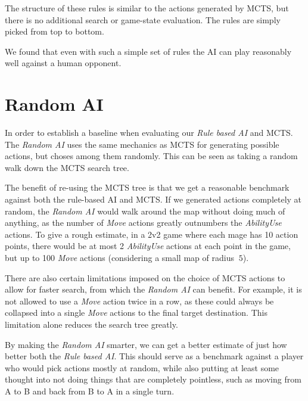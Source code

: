 The structure of these rules is similar to the actions generated by MCTS,
but there is no additional search or game-state evaluation. The rules are
simply picked from top to bottom.

We found that even with such a simple set of rules the AI can play reasonably
well against a human opponent.


\section{Random AI}

In order to establish a baseline when evaluating our \emph{Rule based AI} and MCTS.
The \emph{Random AI} uses the same mechanics as MCTS for generating possible actions,
but choses among them randomly. This can be seen as taking a random walk down
the MCTS search tree.

The benefit of re-using the MCTS tree is that we get a reasonable benchmark against
both the rule-based AI and MCTS. If we generated actions completely at random, the \emph{Random AI}
would walk around the map without doing much of anything, as the number of \emph{Move} actions
greatly outnumbers the \emph{AbilityUse} actions. To give a rough estimate, in a 2v2 game where
each mage has 10 action points, there would be at most 2 \emph{AbilityUse} actions at each point
in the game, but up to 100 \emph{Move} actions (considering a small map of radius $~5$).

There are also certain limitations imposed on the choice of MCTS actions to allow for faster search,
from which the \emph{Random AI} can benefit. For example, it is not allowed to use a \emph{Move}
action twice in a row, as these could always be collapsed into a single \emph{Move} actions to the
final target destination. This limitation alone reduces the search tree greatly.

By making the \emph{Random AI} smarter, we can get a better estimate of just how better
both the \emph{Rule based AI}. This should serve as a benchmark against a player who would
pick actions mostly at random, while also putting at least some thought into not doing things
that are completely pointless, such as moving from A to B and back from B to A in a single turn.
